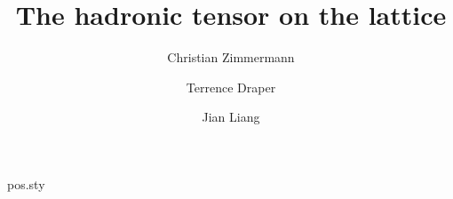 \begin{filecontents*}{pos.sty}
\gdef\FullConference@box{\relax}
\newcommand\FullConference[1]{\gdef\FullConference@box{\vbox{\small\raggedright\it #1}}}
\newtoks\affil@toks\newif\ifaffil\affilfalse
\newcommand{\affiliation}[2][]{\affiltrue
  \if!#1!\affil@toks=\expandafter{\the\affil@toks{\item[]#2}}%
  \else\affil@toks=\expandafter{\the\affil@toks{\item[$^{#1}$]#2}}\fi}
\newtoks\email@toks{}%
\newcommand{\emailAdd}[1]{\emailaddtrue%
  \ifnum\theemail@counter>0\email@toks=\expandafter{\the\email@toks, \@email{#1}}%
  \else\email@toks=\expandafter{\the\email@toks\@email{#1}}\fi\stepcounter{email@counter}}
\newcommand{\@email}[1]{\href{mailto:#1}{#1}}
\renewcommand\maketitle{\begingroup
  \begin{flushleft}
    {\LARGE\bfseries \@title\par}\medskip
    {\bfseries \printAuthors\par}
    \ifaffil\begin{list}{}{}\itshape\small\the\affil@toks\end{list}\fi
    \ifemailadd\textit{E-mail:} {\ttfamily\small\the\email@toks}\par\fi
    \if!\@abstract!\else\parbox{.9\textwidth}{\small\@abstract}\par\fi
    \FullConference@box
  \end{flushleft}
  \endgroup\setcounter{footnote}{0}}
\end{filecontents*}
\documentclass[a4paper,11pt]{article}
\usepackage{pos}
\title{The hadronic tensor on the lattice}
\author*[a,b]{Christian Zimmermann}
\author[a]{Terrence Draper}
\author[c]{Jian Liang}

\maketitle
Body.

